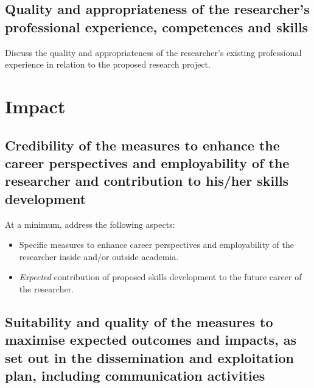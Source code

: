 \documentclass[12pt,draftproposal]{msca-pf}
\begin{document}
\subsection{Quality and appropriateness of the researcher's professional
    experience, competences and skills}
\label{ssc:excellence:researcher}

\begin{mscaexplanation}
Discuss the quality and appropriateness of the researcher’s existing professional
experience in relation to the proposed research project.
\end{mscaexplanation}

\section{Impact}
\label{sc:impact}

\subsection{Credibility of the measures to enhance the career perspectives
    and employability of the researcher and contribution to his/her skills
    development}
\label{ssc:impact:career}

\begin{mscaexplanation}
At a minimum, address the following aspects:

\begin{itemize}
    \item Specific measures to enhance career perspectives and employability of
    the researcher inside and/or outside academia.
    \item \emph{Expected} contribution of proposed skills development to the
    future career of the researcher.
\end{itemize}
\end{mscaexplanation}

\subsection{Suitability and quality of the measures to maximise expected
    outcomes and impacts, as set out in the dissemination and exploitation plan,
    including communication activities}
\label{ssc:impact:outcomes}
\end{document}
